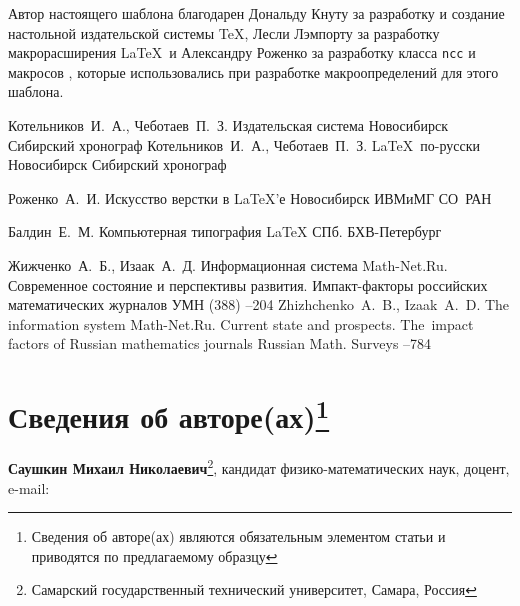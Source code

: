 \documentclass[10pt,twoside,book,a5paper]{ncc}
\begin{document}
Автор настоящего шаблона благодарен Дональду Кнуту за разработку и создание настольной издательской системы \TeX,
Лесли Лэмпорту за разработку макрорасширения \LaTeX\ и Александру Роженко за разработку класса \verb"ncc" и макросов \NCC, которые использовались при разработке макроопределений для этого шаблона.


\begin{thebibliography}{99}
\by Котельников~И.~А., Чеботаев~П.~З.
\book Издательская система \LaTeXe
\publaddr Новосибирск
\publ Сибирский хронограф
\morerref
\by Котельников~И.~А., Чеботаев~П.~З.
\book \LaTeX\ по-русски 
\publaddr Новосибирск
\publ Сибирский хронограф


\by Роженко~А.~И. 
\book Искусство верстки в \LaTeX'е
\publaddr Новосибирск
\publ ИВМиМГ СО~РАН

\by Балдин~Е.~М. 
\book Компьютерная типография \LaTeX
\publaddr СПб.
\publ БХВ-Петербург

\by Жижченко~А.~Б., Изаак~А.~Д.
\paper Информационная система Math-Net.Ru. Современное состояние и перспективы развития. Импакт-факторы российских математических журналов
\jour УМН
(388)
--204
\transl
\by Zhizhchenko~A.~B., Izaak~A.~D.
\paper The information system Math-Net.Ru. Current state and prospects. The~impact factors of Russian mathematics journals
\jour Russian Math. Surveys
--784

\end{thebibliography}

\section*{Сведения об авторе(ах)\protect\footnote{Сведения об авторе(ах) являются обязательным элементом статьи и приводятся по предлагаемому образцу}}

\begin{minipage}{\textwidth} 
\small
\noindent \textbf{Саушкин Михаил Николаевич}\footnote{Самарский государственный технический университет, Самара, Россия}, кандидат физико-математических наук, доцент, e-mail: \par 
\end{minipage}

\end{document}
